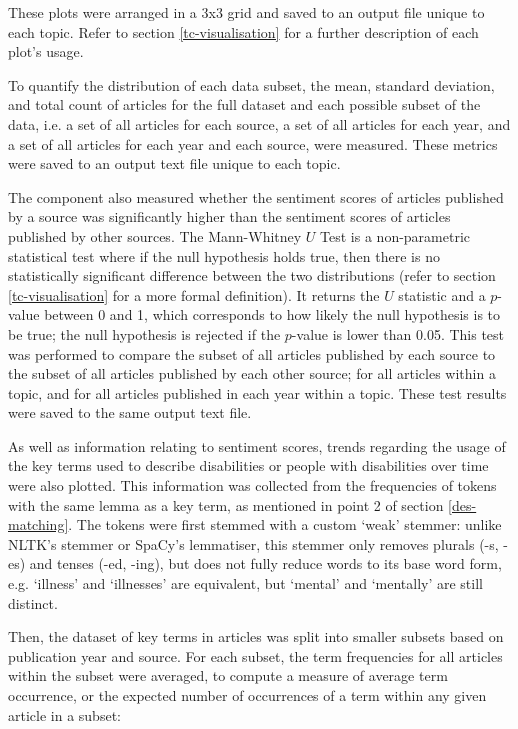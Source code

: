 \documentclass{report}
\begin{document}
These plots were arranged in a 3x3 grid and saved to an output file unique to each topic. 
Refer to section \ref{tc-visualisation} for a further description of each plot's usage.

To quantify the distribution of each data subset, the mean, standard deviation, and total count of articles for the full dataset and each possible subset of the data, i.e. a set of all articles for each source, a set of all articles for each year, and a set of all articles for each year and each source, were measured. 
These metrics were saved to an output text file unique to each topic.

The component also measured whether the sentiment scores of articles published by a source was significantly higher than the sentiment scores of articles published by other sources. 
The Mann-Whitney $U$ Test \cite{mann1947test} is a non-parametric statistical test where if the null hypothesis holds true, then there is no statistically significant difference between the two distributions (refer to section \ref{tc-visualisation} for a more formal definition).
It returns the $U$ statistic and a $p$-value between 0 and 1, which corresponds to how likely the null hypothesis is to be true; the null hypothesis is rejected if the $p$-value is lower than 0.05.
This test was performed to compare the subset of all articles published by each source to the subset of all articles published by each other source; for all articles within a topic, and for all articles published in each year within a topic.
These test results were saved to the same output text file.

As well as information relating to sentiment scores, trends regarding the usage of the key terms used to describe disabilities or people with disabilities over time were also plotted.
This information was collected from the frequencies of tokens with the same lemma as a key term, as mentioned in point 2 of section \ref{des-matching}.
The tokens were first stemmed with a custom `weak' stemmer: unlike NLTK's stemmer or SpaCy's lemmatiser, this stemmer only removes plurals (-s, -es) and tenses (-ed, -ing), but does not fully reduce words to its base word form, e.g. `illness' and `illnesses' are equivalent, but `mental' and `mentally' are still distinct.

Then, the dataset of key terms in articles was split into smaller subsets based on publication year and source.
For each subset, the term frequencies for all articles within the subset were averaged, to compute a measure of average term occurrence, or the expected number of occurrences of a term within any given article in a subset:
\end{document}
